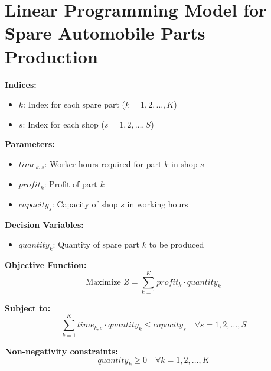 \documentclass{article}
\begin{document}
\section*{Linear Programming Model for Spare Automobile Parts Production}

\textbf{Indices:}  
\begin{itemize}
    \item $k$: Index for each spare part ($k = 1, 2, \ldots, K$)
    \item $s$: Index for each shop ($s = 1, 2, \ldots, S$)
\end{itemize}

\textbf{Parameters:}  
\begin{itemize}
    \item $time_{k,s}$: Worker-hours required for part $k$ in shop $s$
    \item $profit_k$: Profit of part $k$
    \item $capacity_s$: Capacity of shop $s$ in working hours
\end{itemize}

\textbf{Decision Variables:}  
\begin{itemize}
    \item $quantity_k$: Quantity of spare part $k$ to be produced
\end{itemize}

\textbf{Objective Function:}  
\[
\text{Maximize } Z = \sum_{k=1}^{K} profit_k \cdot quantity_k
\]

\textbf{Subject to:}  
\[
\sum_{k=1}^{K} time_{k,s} \cdot quantity_k \leq capacity_s \quad \forall s = 1, 2, \ldots, S
\]

\textbf{Non-negativity constraints:}  
\[
quantity_k \geq 0 \quad \forall k = 1, 2, \ldots, K
\]
\end{document}
